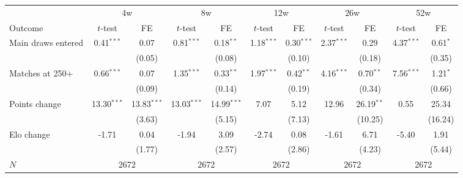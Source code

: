 \begin{tabular}{l cc cc cc cc cc}
\toprule
 & \multicolumn{2}{c}{4w} & \multicolumn{2}{c}{8w} & \multicolumn{2}{c}{12w} & \multicolumn{2}{c}{26w} & \multicolumn{2}{c}{52w} \\
\cmidrule(lr){2-3} \cmidrule(lr){4-5} \cmidrule(lr){6-7} \cmidrule(lr){8-9} \cmidrule(lr){10-11}
Outcome & $t$-test & FE & $t$-test & FE & $t$-test & FE & $t$-test & FE & $t$-test & FE \\
\midrule
Main draws entered & 0.41$^{***}$ & 0.07 & 0.81$^{***}$ & 0.18$^{**}$ & 1.18$^{***}$ & 0.30$^{***}$ & 2.37$^{***}$ & 0.29 & 4.37$^{***}$ & 0.61$^{*}$ \\
 & & (0.05) & & (0.08) & & (0.10) & & (0.18) & & (0.35) \\
\addlinespace
Matches at 250+ & 0.66$^{***}$ & 0.07 & 1.35$^{***}$ & 0.33$^{**}$ & 1.97$^{***}$ & 0.42$^{**}$ & 4.16$^{***}$ & 0.70$^{**}$ & 7.56$^{***}$ & 1.21$^{*}$ \\
 & & (0.09) & & (0.14) & & (0.19) & & (0.34) & & (0.66) \\
\addlinespace
Points change & 13.30$^{***}$ & 13.83$^{***}$ & 13.03$^{***}$ & 14.99$^{***}$ & 7.07 & 5.12 & 12.96 & 26.19$^{**}$ & 0.55 & 25.34 \\
 & & (3.63) & & (5.15) & & (7.13) & & (10.25) & & (16.24) \\
\addlinespace
Elo change & -1.71 & 0.04 & -1.94 & 3.09 & -2.74 & 0.08 & -1.61 & 6.71 & -5.40 & 1.91 \\
 & & (1.77) & & (2.57) & & (2.86) & & (4.23) & & (5.44) \\
\addlinespace
$N$ & \multicolumn{2}{c}{2672} & \multicolumn{2}{c}{2672} & \multicolumn{2}{c}{2672} & \multicolumn{2}{c}{2672} & \multicolumn{2}{c}{2672} \\
\bottomrule
\end{tabular}
